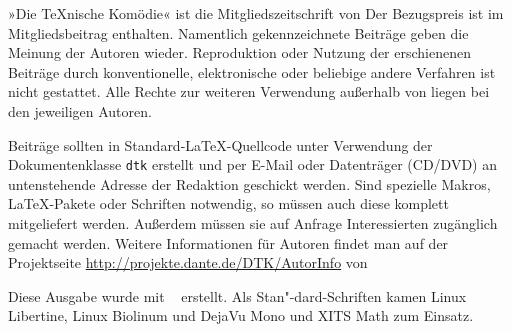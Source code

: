 \begingroup
\small

»Die \TeX{}nische Komödie« ist die Mitgliedszeitschrift von
\dante{} Der Bezugspreis ist im Mitgliedsbeitrag enthalten.
Namentlich gekennzeichnete Beiträge geben die Meinung der
Autoren wieder.  Reproduktion oder Nutzung der erschienenen
Beiträge durch konventionelle, elektronische oder beliebige andere
Verfahren ist nicht gestattet. Alle Rechte zur weiteren Verwendung
außerhalb von \dante{} liegen bei den jeweiligen Autoren.

Beiträge sollten in Standard-\LaTeX-Quellcode unter Verwendung der
Dokumentenklasse \texttt{dtk} erstellt und per \mbox{E-Mail} oder
Datenträger (CD/DVD) an untenstehende Adresse
der Redaktion geschickt werden.  Sind
spezielle Makros, \LaTeX-Pakete oder Schriften notwendig, so
müssen auch diese komplett mitgeliefert werden.  Außerdem müssen sie auf
Anfrage Interessierten zugänglich gemacht werden. Weitere Informationen
für Autoren
findet man auf der Projektseite \url{http://projekte.dante.de/DTK/AutorInfo}
von \dante

\smallskip

Diese Ausgabe wurde mit \texttt{\,\InfoTeX} erstellt.
Als Stan"-dard-Schriften kamen Linux Libertine, Linux Biolinum
und DejaVu Mono und XITS Math zum Einsatz.


